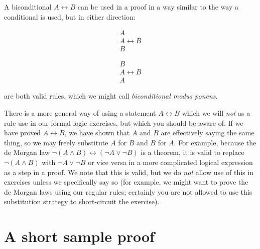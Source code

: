 \documentclass[12pt]{article}
\begin{document}
A biconditional $A \leftrightarrow B$ can be used in a proof in a way similar to the way a conditional is used, but in either direction:

$$\begin{array}{c}

A \\

A \leftrightarrow B \\ \hline

B

\end{array}$$

$$\begin{array}{c}

B \\

A \leftrightarrow B \\ \hline

A

\end{array}$$

are both valid rules, which we might call {\em biconditional modus ponens\/}.

{\tiny There is a more general way of using a statement $A \leftrightarrow B$ which we will {\em not\/} as a rule use in our formal logic exercises, but which you should be aware of.
If we have proved $A \leftrightarrow B$, we have shown that $A$ and $B$ are effectively saying the same thing, so we may freely substitute $A$ for $B$ and $B$ for $A$.
For example, because the de Morgan law $\neg(A \wedge B) \leftrightarrow (\neg A \vee \neg B)$ is a theorem, it is valid to replace $\neg(A \wedge B)$ with $\neg A \vee \neg B$ or vice versa
in a more complicated logical expression as a step in a proof.  We note that this is valid, but we do {\em not\/} allow use of this in exercises unless we specifically say so (for example, we might want to prove the de Morgan laws using our regular rules;  certainly you are not allowed to use this substitution strategy to short-circuit the exercise).}

\newpage

\section{A short sample proof}
\end{document}

